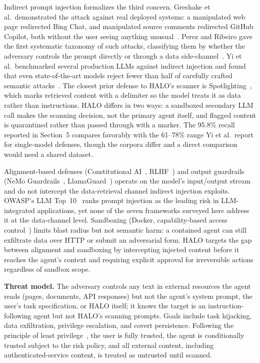 \documentclass[a4paper, 11pt]{article}
\begin{document}
Indirect prompt injection formalizes the third concern. Greshake et al.\
demonstrated the attack against real deployed systems: a manipulated web page
redirected Bing Chat, and manipulated source comments redirected GitHub Copilot,
both without the user seeing anything unusual~\cite{greshake2023indirect}. Perez
and Ribeiro gave the first systematic taxonomy of such attacks, classifying them
by whether the adversary controls the prompt directly or through a data
side-channel~\cite{perez2022ignore}. Yi et al.\ benchmarked several production
LLMs against indirect injection and found that even state-of-the-art models
reject fewer than half of carefully crafted semantic attacks~\cite{yi2023benchmarking}.
The closest prior defense to HALO's scanner is Spotlighting~\cite{hines2024spotlighting},
which marks retrieved content with a delimiter so the model treats it as data
rather than instructions. HALO differs in two ways: a sandboxed secondary LLM
call makes the scanning decision, not the primary agent itself, and flagged
content is quarantined rather than passed through with a marker. The 95.8\%
recall reported in Section~5 compares favorably with the 61--78\% range Yi et al.\
report for single-model defenses, though the corpora differ and a direct
comparison would need a shared dataset.

\begin{sloppypar}
Alignment-based defenses (Constitutional AI~\cite{bai2022constitutional},
RLHF~\cite{ziegler2019rlhf}) and output guardrails (NeMo
Guardrails~\cite{rebedea2023nemo}, LlamaGuard~\cite{inan2023llamaguard}) operate
on the model's input/output stream and do not intercept the data-retrieval
channel indirect injection exploits. OWASP's LLM Top~10~\cite{owasp2025llm} ranks
prompt injection as the leading risk in LLM-integrated applications, yet none of
the seven frameworks surveyed here address it at the data-channel level.
Sandboxing (Docker, capability-based access control~\cite{saltzer1975protection})
limits blast radius but not semantic harm: a contained agent can still exfiltrate
data over HTTP or submit an adversarial form. HALO targets the gap between
alignment and sandboxing by intercepting injected content before it reaches the
agent's context and requiring explicit approval for irreversible actions
regardless of sandbox scope.
\end{sloppypar}

\textbf{Threat model.} The adversary controls any text in external resources the
agent reads (pages, documents, API responses) but not the agent's system prompt,
the user's task specification, or HALO itself; it knows the target is an
instruction-following agent but not HALO's scanning prompts. Goals include task
hijacking, data exfiltration, privilege escalation, and covert persistence.
Following the principle of least privilege~\cite{saltzer1975protection}, the user
is fully trusted, the agent is conditionally trusted subject to the risk policy,
and all external content, including authenticated-service content, is treated as
untrusted until scanned.
\end{document}
